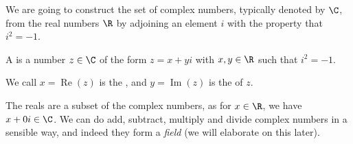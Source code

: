 \documentclass[a4]{scrreprt}
\begin{document}




We are going to construct the set of complex numbers, typically denoted by $\C$, from the real numbers $\R$ by adjoining an element $i$ with the property that $i^2 = -1$.

\begin{definition}
	A  is a number $z \in \C$ of the form $z = x + yi$ with $x, y \in \R$ such that $i^2 = -1$. 
	
	We call $x = \operatorname{Re}(z)$ is the , and $y = \operatorname{Im}(z)$ is the  of $z$.
\end{definition}

The reals are a subset of the complex numbers, as for $x \in \R$, we have $x + 0i \in \C$. We can do add, subtract, multiply and divide complex numbers in a sensible way, and indeed they form a \emph{field} (we will elaborate on this later).
\end{document}
